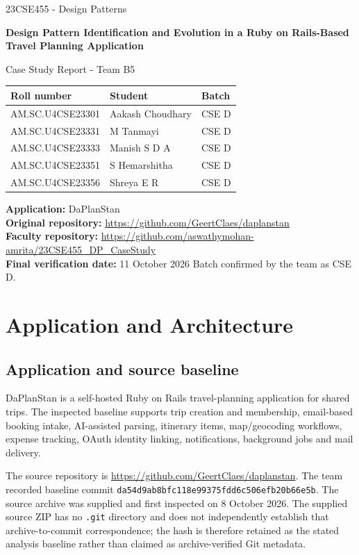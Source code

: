 \documentclass[11pt,a4paper]{article}
\renewcommand{\_}{\textunderscore\allowbreak}
\begin{document}
\begin{titlepage}
\centering
{\Large 23CSE455 - Design Patterns\par}
\vspace{0.8cm}
{\LARGE\bfseries Design Pattern Identification and Evolution in a Ruby on Rails-Based Travel Planning Application\par}
\vspace{0.8cm}
{\Large Case Study Report - Team B5\par}
\vspace{1.1cm}
\begin{tabular}{lll}
\toprule
Roll number & Student & Batch \\
\midrule
AM.SC.U4CSE23301 & Aakash Choudhary &  CSE D \\
AM.SC.U4CSE23331 & M Tanmayi &  CSE D \\
AM.SC.U4CSE23333 & Manish S D A &  CSE D \\
AM.SC.U4CSE23351 & S Hemarshitha &  CSE D \\
AM.SC.U4CSE23356 & Shreya E R &  CSE D \\
\bottomrule
\end{tabular}
\vfill
\textbf{Application:} DaPlanStan\\
\textbf{Original repository:} \url{https://github.com/GeertClaes/daplanstan}\\
\textbf{Faculty repository:} \url{https://github.com/aswathymohan-amrita/23CSE455_DP_CaseStudy}\\
\textbf{Final verification date:} 11 October 2026
\vfill
{\small Batch confirmed by the team as CSE D.}
\end{titlepage}
\tableofcontents
\newpage

\section{Application and Architecture}
\subsection{Application and source baseline}
DaPlanStan is a self-hosted Ruby on Rails travel-planning application for shared trips. The inspected baseline supports trip creation and membership, email-based booking intake, AI-assisted parsing, itinerary items, map/geocoding workflows, expense tracking, OAuth identity linking, notifications, background jobs and mail delivery.

The source repository is \url{https://github.com/GeertClaes/daplanstan}. The team recorded baseline commit \texttt{da54d9ab8bfc118e99375fdd6c506efb20b66e5b}. The source archive was supplied and first inspected on 8 October 2026. The supplied source ZIP has no \texttt{.git} directory and does not independently establish that archive-to-commit correspondence; the hash is therefore retained as the stated analysis baseline rather than claimed as archive-verified Git metadata.
\end{document}
